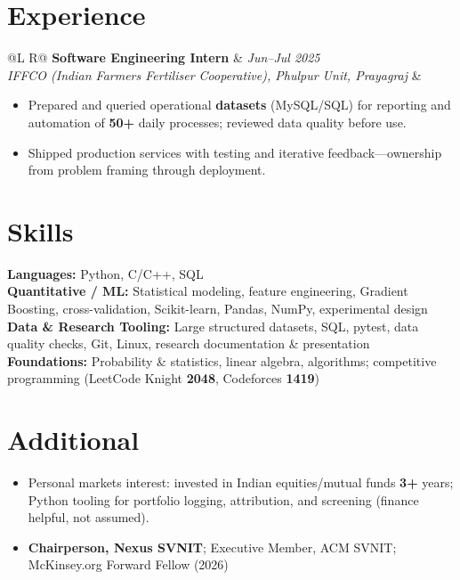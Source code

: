 \documentclass[a4paper,10pt]{article}
\makeatletter
\newcommand{\job}[4]{%
  \vspace{0.8mm}
  \noindent\begin{tabularx}{\textwidth}{@{}L R@{}}
    \textbf{#1} & \textit{\small #2} \\
    \textit{\small #3} & \\
  \end{tabularx}\par
  \vspace{0.4mm}%
}
\makeatother
\begin{document}
\section{Experience}
\job{Software Engineering Intern}{Jun--Jul 2025}{IFFCO (Indian Farmers Fertiliser Cooperative), Phulpur Unit, Prayagraj}{}
\begin{itemize}
  \item Prepared and queried operational \textbf{datasets} (MySQL/SQL) for reporting and automation of \textbf{50+} daily processes; reviewed data quality before use.
  \item Shipped production services with testing and iterative feedback---ownership from problem framing through deployment.
\end{itemize}

\section{Skills}
\noindent\small
\textbf{Languages:} Python, C/C++, SQL \\[0.5mm]
\textbf{Quantitative / ML:} Statistical modeling, feature engineering, Gradient Boosting, cross-validation, Scikit-learn, Pandas, NumPy, experimental design \\[0.5mm]
\textbf{Data \& Research Tooling:} Large structured datasets, SQL, pytest, data quality checks, Git, Linux, research documentation \& presentation \\[0.5mm]
\textbf{Foundations:} Probability \& statistics, linear algebra, algorithms; competitive programming (LeetCode Knight \textbf{2048}, Codeforces \textbf{1419})

\section{Additional}
\begin{itemize}
  \item Personal markets interest: invested in Indian equities/mutual funds \textbf{3+} years; Python tooling for portfolio logging, attribution, and screening (finance helpful, not assumed).
  \item \textbf{Chairperson, Nexus SVNIT}; Executive Member, ACM SVNIT; McKinsey.org Forward Fellow (2026)
\end{itemize}
\end{document}
